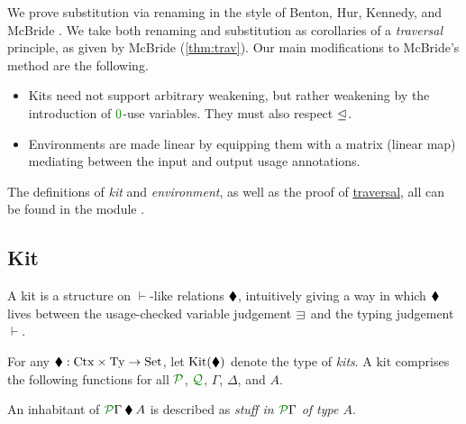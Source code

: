 \documentclass[submission,copyright,creativecommons]{eptcs}
\begin{document}
We prove substitution via renaming in the style of Benton, Hur, Kennedy, and
McBride \cite{bhkm12}.
We take both renaming and substitution as corollaries of a \emph{traversal}
principle, as given by McBride \cite{rensub05} (\autoref{thm:trav}).
Our main modifications to McBride's method are the following.
\begin{itemize}
  \item Kits need not support arbitrary weakening, but rather weakening by the
    introduction of $\rescomment 0$-use variables.
    They must also respect $\trianglelefteq$.
  \item Environments are made linear by equipping them with a matrix (linear
    map) mediating between the input and output usage annotations.
\end{itemize}

The definitions of \emph{kit} and \emph{environment}, as well as the proof of
\hyperref[thm:trav]{traversal}, all can be found in the module
.

\subsection{Kit}

A kit is a structure on $\vdash$-like relations $\mathbin{\blacklozenge}$, intuitively
giving a way in which $\mathbin{\blacklozenge}$ lives between the usage-checked variable
judgement $\lvar$ and the typing judgement $\vdash$.

\begin{definition}\label{def:kit}
  For any $\mathbin{\blacklozenge} : \mathrm{Ctx} \times \mathrm{Ty} \to \mathrm{Set}$, let
  $\operatorname{Kit}(\mathbin{\blacklozenge})$ denote the type of \emph{kits}.
  A kit comprises the following functions for all $\resctx P$, $\resctx Q$,
  $\Gamma$, $\Delta$, and $A$.

\end{definition}

An inhabitant of $\ctx{\Gamma}{P} \kitrel A$ is described as
\emph{stuff in $\ctx{\Gamma}{P}$ of type $A$}.
\end{document}
